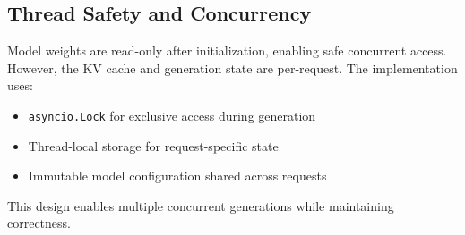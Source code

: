 \subsection{Thread Safety and Concurrency}

Model weights are read-only after initialization, enabling safe concurrent access. However, the KV cache and generation state are per-request. The implementation uses:\

\begin{itemize}
    \item \texttt{asyncio.Lock} for exclusive access during generation
    \item Thread-local storage for request-specific state
    \item Immutable model configuration shared across requests
\end{itemize}

This design enables multiple concurrent generations while maintaining correctness.
